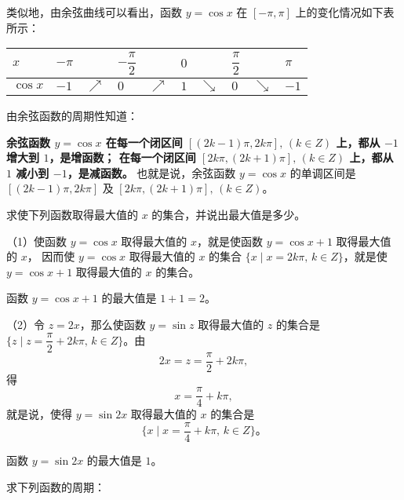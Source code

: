 类似地，由余弦曲线可以看出，函数 $y = \cos x$ 在 $[-\pi, \pi]$ 上的变化情况如下表所示：

\begin{table}[H]
\renewcommand\arraystretch{2}
\begin{tabular}{|w{c}{5em}|*{9}{w{c}{2em}}|}
    \hline
    $x$ & $-\pi$ & & $-\dfrac \pi 2$ & & $0$ & & $\dfrac \pi 2$ & & $\pi$ \\ \hline
    $\cos x$ & $-1$ & $\nearrow$ & $0$ & $\nearrow$ & $1$ & $\searrow$ & $0$ & $\searrow$ & $-1$ \\ \hline
\end{tabular}
\end{table}

由余弦函数的周期性知道：

\textbf{余弦函数 $y = \cos x$
在每一个闭区间 $[(2k - 1)\pi, 2k\pi], \, (k \in Z)$ 上，都从 $-1$ 增大到 $1$，是增函数；
在每一个闭区间 $[2k\pi, (2k + 1)\pi], \, (k \in Z)$ 上，都从 $1$ 减小到 $-1$，是减函数。}
也就是说，余弦函数 $y = \cos x$ 的单调区间是 $[(2k - 1)\pi, 2k\pi]$ 及 $[2k\pi, (2k + 1)\pi], \, (k \in Z)$。

\liti 求使下列函数取得最大值的 $x$ 的集合，并说出最大值是多少。
\begin{xiaoxiaotis}


\end{xiaoxiaotis}

\jie （1）使函数 $y = \cos x$ 取得最大值的 $x$，就是使函数 $y = \cos x + 1$ 取得最大值的 $x$，
因而使 $y = \cos x$ 取得最大值的 $x$ 的集合 $\{ x \mid x = 2k\pi, \, k \in Z \}$，就是使
$y = \cos x + 1$ 取得最大值的 $x$ 的集合。

函数 $y = \cos x + 1$  的最大值是 $1 + 1 = 2$。

（2）令 $z = 2x$，那么使函数 $y = \sin z$ 取得最大值的 $z$ 的集合是
$\{ z \mid z = \dfrac \pi 2 + 2k\pi, \, k \in Z \}$。由
$$2x = z = \dfrac \pi 2 + 2k\pi ,$$
得
$$x = \dfrac \pi 4 + k\pi ,$$
就是说，使得 $y = \sin 2x$ 取得最大值的 $x$ 的集合是
$$\{ x \mid x = \dfrac \pi 4 + k\pi, \, k \in Z \} \text{。}$$

函数 $y = \sin 2x$ 的最大值是 $1$。

\liti 求下列函数的周期：
\begin{xiaoxiaotis}

    \vspace{0.5em}

\end{xiaoxiaotis}


